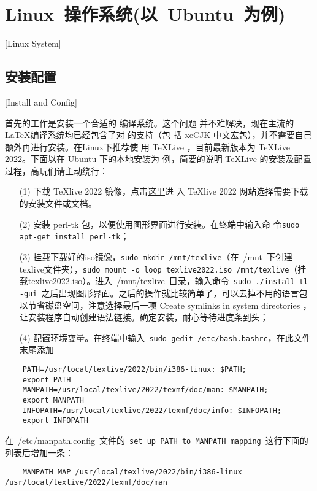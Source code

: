 \section{Linux~操作系统(以~Ubuntu~为例)}[Linux System]

\subsection{安装配置}[Install and Config]

首先的工作是安装一个合适的 \XeTeX{}编译系统。这个问题
并不难解决，现在主流的 \LaTeX{}编译系统均已经包含了对 \XeTeX{}的支持（包
括 xeCJK 中文宏包），并不需要自己额外再进行安装。在Linux下推荐使
用 \TeX{}Live ，目前最新版本为 \TeX{}Live 2022。下面以在 Ubuntu 下的本地安装为
例，简要的说明 \TeX{}Live 的安装及配置过程，高玩们请主动绕行：

\begin{enumerate}
  \item[(1)] 下载 \TeX{}live 2022 镜像，点击\href{https://tug.org/texlive/}{这里}进    入 \TeX{}live 2022 网站选择需要下载的安装文件或文档。
  \item[(2)] 安装 perl-tk 包，以便使用图形界面进行安装。在终端中输入命    令\texttt{sudo apt-get install perl-tk}；
  \item[(3)] 挂载下载好的iso镜像，\texttt{sudo mkdir /mnt/texlive}（在~{/mnt}~下创建texlive文件夹），\texttt{sudo mount -o loop texlive2022.iso  /mnt/texlive}（挂载texlive2022.iso）。进入~/mnt/texlive~目录，输入命令~\texttt{sudo ./install-tl -gui}~之后出现图形界面。之后的操作就比较简单了，可以去掉不用的语言包以节省磁盘空间，注意选择最后一项 Create symlinks in system directories ，让安装程序自动创建语法链接。确定安装，耐心等待进度条到头；
  \item[(4)] 配置环境变量。在终端中输入~\texttt{sudo gedit /etc/bash.bashrc}，在此文件末尾添加
\end{enumerate}

\begin{lstlisting}
    PATH=/usr/local/texlive/2022/bin/i386-linux: $PATH;
    export PATH
    MANPATH=/usr/local/texlive/2022/texmf/doc/man: $MANPATH;
    export MANPATH
    INFOPATH=/usr/local/texlive/2022/texmf/doc/info: $INFOPATH;
    export INFOPATH
\end{lstlisting}

在~{/etc/manpath.config}~文件的~\texttt{set up PATH to  MANPATH mapping}~这行下面的列表后增加一条：

\begin{lstlisting}
    MANPATH_MAP /usr/local/texlive/2022/bin/i386-linux  /usr/local/texlive/2022/texmf/doc/man
\end{lstlisting}


